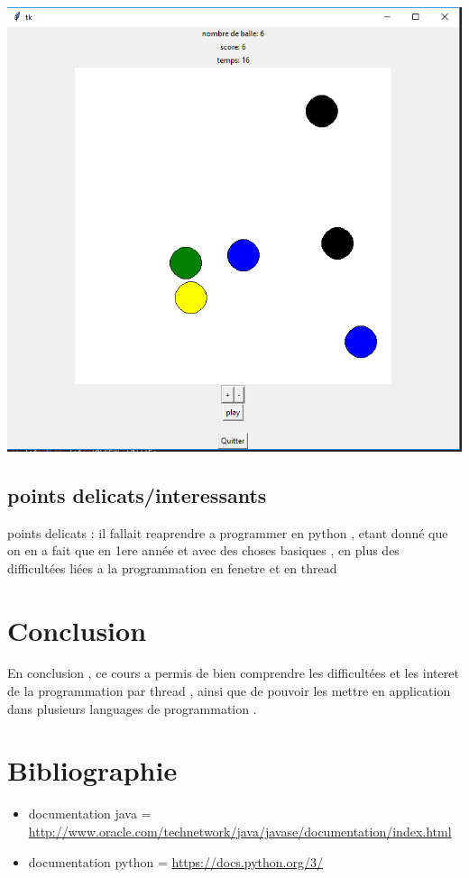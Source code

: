 \documentclass{report}
\begin{document}
\begin{center}
  \includegraphics[scale=0.5]{ballepython.PNG}
\end{center}
\subsection{points delicats/interessants }
points delicats : il fallait reaprendre a programmer en python , etant donné que on en a fait que en 1ere année et avec des choses basiques , en plus des difficultées liées a la programmation en fenetre et en thread

\section{Conclusion}
En conclusion , ce cours a permis de bien comprendre les difficultées et les interet de la programmation par thread , ainsi que de pouvoir les mettre en application dans plusieurs languages de programmation . 

\section{Bibliographie}


\begin{itemize}
\item documentation java = {\url{http://www.oracle.com/technetwork/java/javase/documentation/index.html}}
\item documentation python = {\url {https://docs.python.org/3/}}

\end{itemize}
\end{document}
